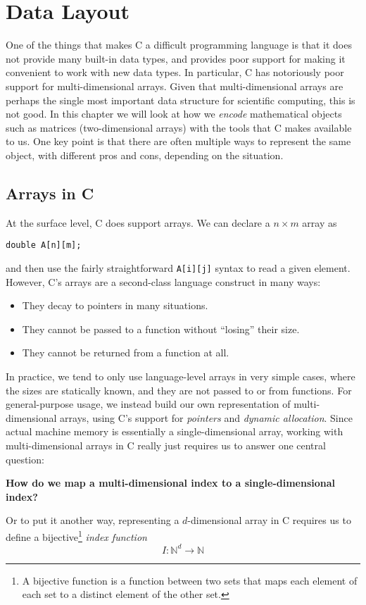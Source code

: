\lstset{language=C}

\chapter{Data Layout}
\label{chap:datalayout}

One of the things that makes C a difficult programming language is
that it does not provide many built-in data types, and provides poor
support for making it convenient to work with new data types.  In
particular, C has notoriously poor support for multi-dimensional
arrays.  Given that multi-dimensional arrays are perhaps the single
most important data structure for scientific computing, this is not
good.  In this chapter we will look at how we \textit{encode}
mathematical objects such as matrices (two-dimensional arrays) with
the tools that C makes available to us.  One key point is that there
are often multiple ways to represent the same object, with different
pros and cons, depending on the situation.

\section{Arrays in C}

At the surface level, C does support arrays.  We can declare a
$n\times{}m$ array as
\begin{lstlisting}
double A[n][m];
\end{lstlisting}
and then use the fairly straightforward \lstinline{A[i][j]} syntax to
read a given element.  However, C's arrays are a second-class language
construct in many ways:

\begin{itemize}
\item They decay to pointers in many situations.
\item They cannot be passed to a function without ``losing'' their
  size.
\item They cannot be returned from a function at all.
\end{itemize}

In practice, we tend to only use language-level arrays in very simple
cases, where the sizes are statically known, and they are not passed
to or from functions.  For general-purpose usage, we instead build our
own representation of multi-dimensional arrays, using C's support for
\textit{pointers} and \textit{dynamic allocation}.  Since actual
machine memory is essentially a single-dimensional array, working with
multi-dimensional arrays in C really just requires us to answer one
central question:
\begin{center}
  \textbf{How do we map a multi-dimensional index to a
    single-dimensional index?}
\end{center}
Or to put it another way, representing a $d$-dimensional array in C
requires us to define a bijective\footnote{A bijective function is a
  function between two sets that maps each element of each set to a
  distinct element of the other set.} \textit{index function}
\begin{equation}
  I : \mathbb{N}^{d} \rightarrow \mathbb{N}
\end{equation}

